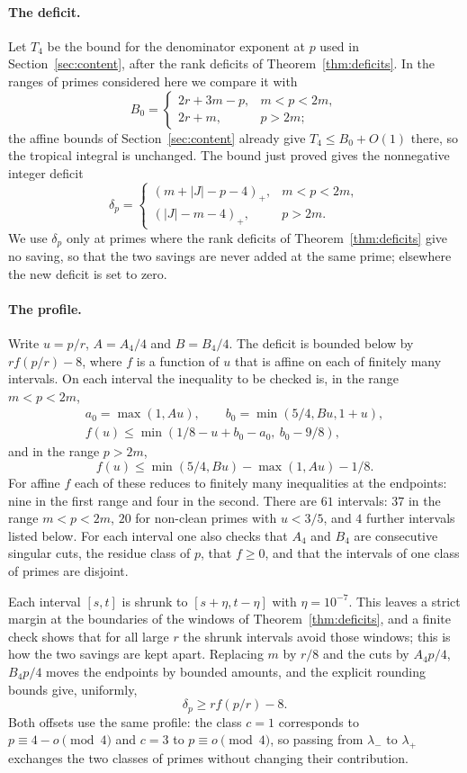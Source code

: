 \paragraph{The deficit.}
Let $T_4$ be the bound for the denominator exponent at $p$ used in
Section~\ref{sec:content}, after the rank deficits of Theorem~\ref{thm:deficits}.
In the ranges of primes considered here we compare it with
\[
 B_0=\begin{cases}2r+3m-p,&m<p<2m,\\2r+m,&p>2m;\end{cases}
\]
the affine bounds of Section~\ref{sec:content} already give $T_4\le B_0+O(1)$
there, so the tropical integral is unchanged. The bound just proved gives the
nonnegative integer deficit
\[
 \delta_p=\begin{cases}
 (m+|J|-p-4)_+,&m<p<2m,\\
 (|J|-m-4)_+,&p>2m.
 \end{cases}
\]
We use $\delta_p$ only at primes where the rank deficits of
Theorem~\ref{thm:deficits} give no saving, so that the two savings are never
added at the same prime; elsewhere the new deficit is set to zero.

\paragraph{The profile.}
Write $u=p/r$, $A=A_4/4$ and $B=B_4/4$. The deficit is bounded below by
$r f(p/r)-8$, where $f$ is a function of $u$ that is affine on each of finitely
many intervals. On each interval the inequality to be checked is, in the range
$m<p<2m$,
\[
 \begin{gathered}a_0=\max(1,Au),\qquad b_0=\min(5/4,Bu,1+u),\\
 f(u)\le\min(1/8-u+b_0-a_0,\ b_0-9/8),\end{gathered}
\]
and in the range $p>2m$,
\[
 f(u)\le\min(5/4,Bu)-\max(1,Au)-1/8.
\]
For affine $f$ each of these reduces to finitely many inequalities at the
endpoints: nine in the first range and four in the second. There are $61$
intervals: $37$ in the range $m<p<2m$, $20$ for non-clean primes with $u<3/5$,
and $4$ further intervals listed below. For each interval one also checks that
$A_4$ and $B_4$ are consecutive singular cuts, the residue class of $p$, that
$f\ge0$, and that the intervals of one class of primes are disjoint.

Each interval $[s,t]$ is shrunk to $[s+\eta,t-\eta]$ with $\eta=10^{-7}$. This
leaves a strict margin at the boundaries of the windows of
Theorem~\ref{thm:deficits}, and a finite check shows that for all large $r$
the shrunk intervals avoid those windows; this is how the two savings are kept
apart. Replacing $m$ by $r/8$ and the cuts by $A_4p/4$, $B_4p/4$ moves the
endpoints by bounded amounts, and the explicit rounding bounds give, uniformly,
\[
 \delta_p\ge r f(p/r)-8.
\]
Both offsets use the same profile: the class $c=1$ corresponds to
$p\equiv4-o\pmod4$ and $c=3$ to $p\equiv o\pmod4$, so passing from $\lambda_-$ to
$\lambda_+$ exchanges the two classes of primes without changing their
contribution.

